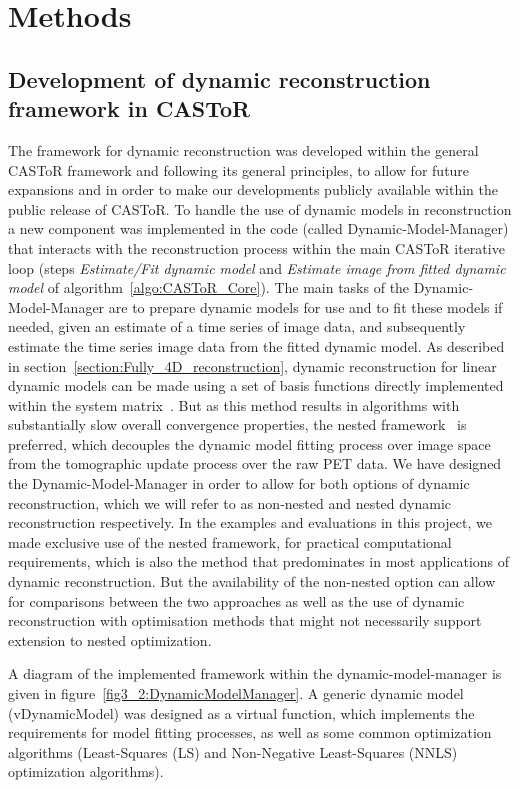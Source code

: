 \section{Methods}

\subsection{Development of dynamic reconstruction framework in CASToR}
The framework for dynamic reconstruction was developed within the general CASToR framework and following its general principles, to allow for future expansions and in order to make our developments publicly available within the public release of CASToR.
To handle the use of dynamic models in reconstruction a new component was implemented in the code (called Dynamic-Model-Manager) that interacts with the reconstruction process within the main CASToR iterative loop (steps \textit{Estimate/Fit dynamic model} and \textit{Estimate image from fitted dynamic model} of algorithm~\ref{algo:CASToR_Core}). 
The main tasks of the Dynamic-Model-Manager are to prepare dynamic models for use and to fit these models if needed, given an estimate of a time series of image data, and subsequently estimate the time series image data from the fitted dynamic model. 
As described in section~\ref{section:Fully_4D_reconstruction}, dynamic reconstruction for linear dynamic models can be made using a set of basis functions directly implemented within the system matrix~\cite{Matthews1995,Wang2008,Reader2014}. But as this method results in algorithms with substantially slow overall convergence properties, the nested framework~\cite{Wang2010,Matthews2010} is preferred, which decouples the dynamic model fitting process over image space from the tomographic update process over the raw PET data.
We have designed the Dynamic-Model-Manager in order to allow for both options of dynamic reconstruction, which we will refer to as non-nested and nested dynamic reconstruction respectively.
In the examples and evaluations in this project, we made exclusive use of the nested framework, for practical computational requirements, which is also the method that predominates in most applications of dynamic reconstruction. But the availability of the non-nested option can allow for comparisons between the two approaches as well as the use of dynamic reconstruction with optimisation methods that might not necessarily support extension to nested optimization.

A diagram of the implemented framework within the dynamic-model-manager is given in figure~\ref{fig3_2:DynamicModelManager}. 
A generic dynamic model (vDynamicModel) was designed as a virtual function, which implements the requirements for model fitting processes, as well as some common optimization algorithms (Least-Squares (LS) and Non-Negative Least-Squares (NNLS) optimization algorithms).

